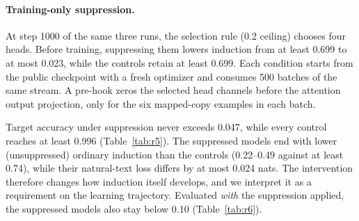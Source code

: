\paragraph{Training-only suppression.}
At step 1000 of the same three runs, the selection rule (0.2 ceiling) chooses four
heads. Before training, suppressing them lowers induction from at least 0.699 to at
most 0.023, while the controls retain at least 0.699. Each condition starts from the
public checkpoint with a fresh optimizer and consumes 500 batches of the same
stream. A pre-hook zeros the selected head channels before the attention output
projection, only for the six mapped-copy examples in each batch.

Target accuracy under suppression never exceeds 0.047, while every control reaches
at least 0.996 (Table~\ref{tab:r5}). The suppressed models end with lower
(unsuppressed) ordinary induction than the controls (0.22--0.49 against at least
0.74), while their natural-text loss differs by at most 0.024 nats. The
intervention therefore changes how induction itself develops, and we interpret it
as a requirement on the learning trajectory. Evaluated \emph{with} the suppression
applied, the suppressed models also stay below 0.10 (Table~\ref{tab:r6}).

\begin{table}[!htbp]
\centering\small
\caption{Pythia-160M training-only suppression (original three runs). \emph{Induction
probe} is the manipulation check before training. Target columns are maxima over
500 updates, evaluated without suppression.}
\label{tab:r5}
\end{table}

